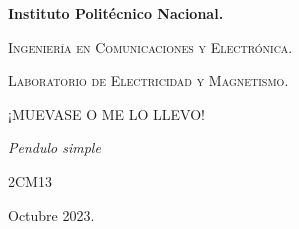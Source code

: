 \documentclass[10pt]{article}
\begin{document}
\pagestyle{fancy}
\cfoot{}


\lhead{}

\begin{titlepage}

	\begin{figure}[t]
		\hspace{0.6\textwidth}
	\end{figure}

	\centering
	{\bfseries\Huge Instituto Politécnico Nacional. \par}
	\vspace{1cm}
	{\scshape\Large Ingeniería en Comunicaciones y Electrónica. \par}
	\vspace{0.3cm}
	{\scshape\Large Laboratorio de Electricidad y Magnetismo.  \par}
	\vspace{1cm}
	{\scshape\Huge ¡MUEVASE O ME LO LLEVO! \par}
	\vspace{1cm}
	{\itshape\Large Pendulo simple \par}
	{\Large 2CM13\par}
	\vfill
	
	{\Large  \par}
	{\Large   \par}
	{\Large  \par}
	{\Large \par}
	{\Large   \par}
	{\Large \par}
	\vfill
	{\Large Octubre 2023. \par}

\end{titlepage}
\end{document}
